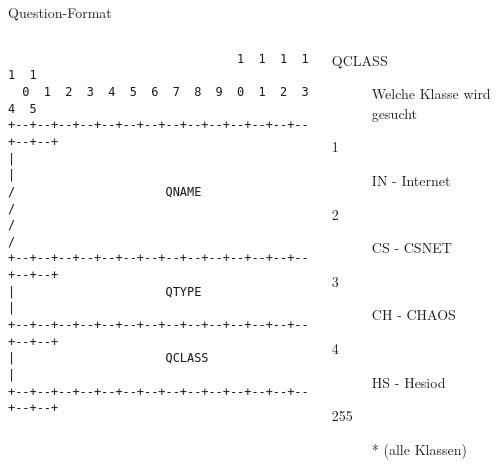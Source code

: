 \documentclass{beamer}
\begin{document}
  \begin{frame}[fragile]{\mytitle}{Question-Format}
    \begin{columns}[c]
      \column{5cm}
      \tiny{
        \begin{verbatim}
                                1  1  1  1  1  1
  0  1  2  3  4  5  6  7  8  9  0  1  2  3  4  5
+--+--+--+--+--+--+--+--+--+--+--+--+--+--+--+--+
|                                               |
/                     QNAME                     /
/                                               /
+--+--+--+--+--+--+--+--+--+--+--+--+--+--+--+--+
|                     QTYPE                     |
+--+--+--+--+--+--+--+--+--+--+--+--+--+--+--+--+
|                     QCLASS                    |
+--+--+--+--+--+--+--+--+--+--+--+--+--+--+--+--+
        \end{verbatim}
      }
      \column{7cm}
        \footnotesize{
       \begin{description}
          \item[QCLASS] Welche Klasse wird gesucht
          \item[1] IN - Internet
          \item[2] CS - CSNET
          \item[3] CH - CHAOS
          \item[4] HS - Hesiod
          \item[255] * (alle Klassen)
        \end{description}
      }
    \end{columns}
\end{frame}
\end{document}
